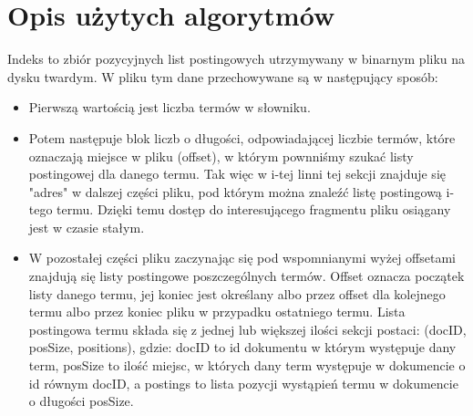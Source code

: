 \documentclass[11pt,leqno]{article}
\begin{document}
\section{Opis użytych algorytmów}

Indeks to zbiór pozycyjnych list postingowych utrzymywany w binarnym pliku na dysku twardym. W pliku tym dane przechowywane są w następujący sposób:

\begin{itemize}
\item Pierwszą wartością jest liczba termów w słowniku.
\item Potem następuje blok liczb o długości, odpowiadającej liczbie termów, które oznaczają miejsce w pliku (offset), w którym pownniśmy szukać listy postingowej dla danego termu. Tak więc w i-tej linni tej sekcji znajduje się "adres" w dalszej części pliku, pod którym można znaleźć listę postingową i-tego termu. Dzięki temu dostęp do interesującego fragmentu pliku osiągany jest w czasie stałym.
\item W pozostałej części pliku zaczynając się pod wspomnianymi wyżej offsetami znajdują się listy postingowe poszczególnych termów. Offset oznacza początek listy danego termu, jej koniec jest określany albo przez offset dla kolejnego termu albo przez koniec pliku w przypadku ostatniego termu. Lista postingowa termu składa się z jednej lub większej ilości sekcji postaci: (docID, posSize, positions), gdzie: docID to id dokumentu w którym występuje dany term, posSize to ilość miejsc, w których dany term występuje w dokumencie o id równym docID, a postings to lista pozycji wystąpień termu w dokumencie o długości posSize. 
\end{itemize} 
\end{document}
